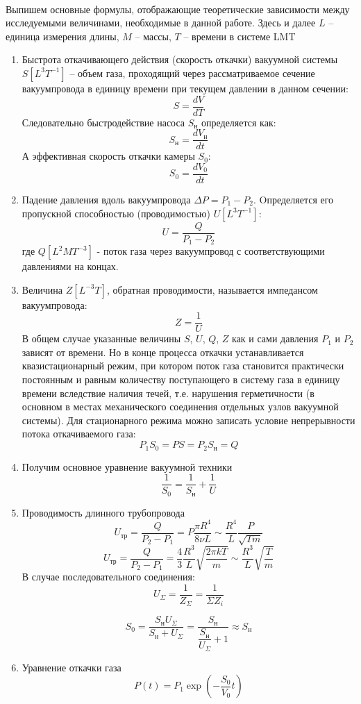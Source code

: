 \documentclass[a4paper,12pt]{article} %
\begin{document}
\paragraph{}
Выпишем основные формулы, отображающие теоретические зависимости между исследуемыми величинами, необходимые в данной работе. Здесь и далее $L$ -- единица измерения длины, $M$ -- массы, $T$ --  времени в системе LMT
\begin{enumerate}
\itemsep0em
\item Быстрота откачивающего действия (скорость откачки) вакуумной системы $S [L^3T^{-1}]$ -- объем газа, проходящий через рассматриваемое сечение вакуумпровода в единицу времени при текущем давлении в данном сечении:
\[S = \dfrac{dV}{dT}\]
Следовательно быстродействие насоса $S_{\text{н}}$ определяется как:
\begin{equation}
 S_{ \text{н} } = \dfrac{dV_{ \text{н} }}{dt}
\end{equation}
А эффективная скорость откачки камеры $S_0$:
\begin{equation}
S_0 = \dfrac{ dV_0 }{ dt } 
\end{equation}
\item Падение давления вдоль вакуумпровода $ \Delta P = P_1 - P_2 $. Oпределяется его пропускной способностью (проводимостью) $ U [L^3 T^{-1} ] $:
\[ U = \dfrac{Q}{P_1 - P_2} \]
где $Q [L^2 M T^{-3}]$ - поток газа через вакуумпровод с соответствующими давлениями на концах.
\item Величина $Z [L^{-3}T]$, обратная проводимости, называется импедансом вакуумпровода:
\[Z=\dfrac{1}{U}\]
В общем случае указанные величины $S$, $U$, $Q$, $Z$ как и сами давления $P_1$ и $P_2$ зависят от времени. Но в конце процесса откачки устанавливается квазистационарный режим, при котором поток газа становится практически постоянным и равным количеству поступающего в систему газа в единицу времени вследствие наличия течей, т.е. нарушения герметичности (в основном в местах механического соединения отдельных узлов вакуумной системы). Для стационарного режима можно записать условие непрерывности потока откачиваемого газа:
\[P_1 S_0 = PS = P_2 S_{\text{н}} = Q \]
\item Получим основное уравнение вакуумной техники
\begin{equation}
\dfrac{1}{S_0} = \dfrac{1}{S_{ \text{н} }} + \dfrac{1}{U}
\end{equation}
\item Проводимость длинного трубопровода
\[U_{\text{тр}} = \dfrac{Q}{P_2 - P_1} = P\dfrac{\pi R^4}{8 \nu L} \sim \dfrac{R^4}{L} \dfrac{P}{\sqrt{Tm}}\]
\[U_{\text{тр}} = \dfrac{Q}{P_2 - P_1} = \dfrac{4}{3} \dfrac{R^3}{L}\sqrt{\dfrac{2 \pi k T}{m}} \sim \dfrac{R^3}{L} \sqrt{\dfrac{T}{m}} \]
В случае последовательного соединения:
\[U_{\Sigma} = \dfrac{1}{Z_{\Sigma}} = \dfrac{1}{\Sigma Z_i}\]

\[S_0 = \dfrac{S_{\text{н}}U_{\Sigma}}{S_{\text{н}} + U_{\Sigma}} = \dfrac{S_{\text{н}}}{\dfrac{S_{\text{н}}}{U_{\Sigma}} + 1} \approx S_{\text{н}} \]	
\item Уравнение откачки газа
\begin{equation}
P(t) = P_1 \exp \left( -\dfrac{S_0}{V_0} t \right)
\end{equation}
\end{enumerate}
\end{document}
